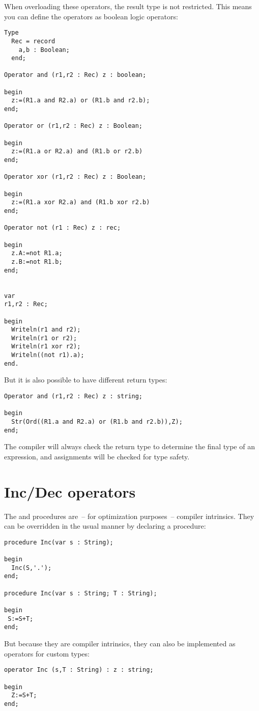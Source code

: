 When overloading these operators, the result type is not restricted. This means you can define the operators as boolean logic operators:
\begin{verbatim}
Type
  Rec = record
    a,b : Boolean;
  end;

Operator and (r1,r2 : Rec) z : boolean;

begin
  z:=(R1.a and R2.a) or (R1.b and r2.b);
end;

Operator or (r1,r2 : Rec) z : Boolean;

begin
  z:=(R1.a or R2.a) and (R1.b or r2.b)
end;

Operator xor (r1,r2 : Rec) z : Boolean;

begin
  z:=(R1.a xor R2.a) and (R1.b xor r2.b)
end;

Operator not (r1 : Rec) z : rec;

begin
  z.A:=not R1.a;
  z.B:=not R1.b;
end;


var
r1,r2 : Rec;

begin
  Writeln(r1 and r2);
  Writeln(r1 or r2);
  Writeln(r1 xor r2);
  Writeln((not r1).a);
end.
\end{verbatim}

But it is also possible to have different return types:

\begin{verbatim}
Operator and (r1,r2 : Rec) z : string;

begin
  Str(Ord((R1.a and R2.a) or (R1.b and r2.b)),Z);
end;
\end{verbatim}

The compiler will always check the return type to determine the final type of an expression,
and assignments will be checked for type safety.

\section{Inc/Dec operators}
The  and  procedures are~-- for optimization purposes~-- compiler intrinsics. They can be
overridden in the usual manner by declaring a procedure:

\begin{verbatim}
procedure Inc(var s : String);

begin
  Inc(S,'.');
end;

procedure Inc(var s : String; T : String);

begin
 S:=S+T;
end;
\end{verbatim}

But because they are compiler intrinsics, they can also be implemented as
operators for custom types:
\begin{verbatim}
operator Inc (s,T : String) : z : string;

begin
  Z:=S+T;
end;
\end{verbatim}

